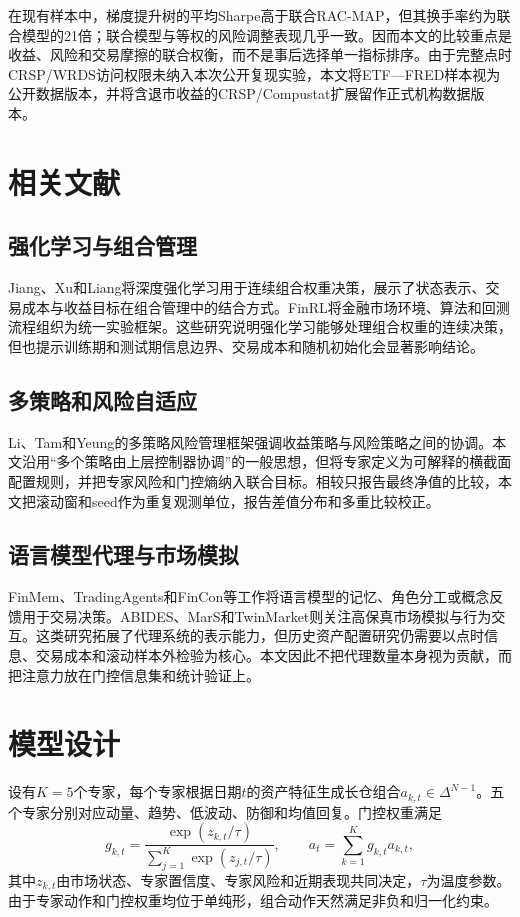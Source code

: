 \documentclass[UTF8,a4paper,zihao=-4]{ctexart}
\begin{document}
在现有样本中，梯度提升树的平均Sharpe高于联合RAC-MAP，但其换手率约为联合模型的21倍；联合模型与等权的风险调整表现几乎一致。因而本文的比较重点是收益、风险和交易摩擦的联合权衡，而不是事后选择单一指标排序。由于完整点时CRSP/WRDS访问权限未纳入本次公开复现实验，本文将ETF—FRED样本视为公开数据版本，并将含退市收益的CRSP/Compustat扩展留作正式机构数据版本。

\section{相关文献}
\subsection{强化学习与组合管理}
Jiang、Xu和Liang\cite{JiangXuLiang2017}将深度强化学习用于连续组合权重决策，展示了状态表示、交易成本与收益目标在组合管理中的结合方式。FinRL将金融市场环境、算法和回测流程组织为统一实验框架\cite{LiuYangChen2020}。这些研究说明强化学习能够处理组合权重的连续决策，但也提示训练期和测试期信息边界、交易成本和随机初始化会显著影响结论。

\subsection{多策略和风险自适应}
Li、Tam和Yeung\cite{LiTamYeung2024}的多策略风险管理框架强调收益策略与风险策略之间的协调。本文沿用“多个策略由上层控制器协调”的一般思想，但将专家定义为可解释的横截面配置规则，并把专家风险和门控熵纳入联合目标。相较只报告最终净值的比较，本文把滚动窗和seed作为重复观测单位，报告差值分布和多重比较校正。

\subsection{语言模型代理与市场模拟}
FinMem、TradingAgents和FinCon等工作将语言模型的记忆、角色分工或概念反馈用于交易决策\cite{YuLiChen2023,XiaoSunLuo2024,YuYaoLi2024}。ABIDES、MarS和TwinMarket则关注高保真市场模拟与行为交互\cite{ByrdHybinetteBalch2019,LiLiuLiu2024,YangZhangWu2025}。这类研究拓展了代理系统的表示能力，但历史资产配置研究仍需要以点时信息、交易成本和滚动样本外检验为核心。本文因此不把代理数量本身视为贡献，而把注意力放在门控信息集和统计验证上。

\section{模型设计}
设有$K=5$个专家，每个专家根据日期$t$的资产特征生成长仓组合$a_{k,t}\in\Delta^{N-1}$。五个专家分别对应动量、趋势、低波动、防御和均值回复。门控权重满足
\begin{equation}
g_{k,t}=\frac{\exp(z_{k,t}/\tau)}{\sum_{j=1}^{K}\exp(z_{j,t}/\tau)},\qquad
 a_t=\sum_{k=1}^{K}g_{k,t}a_{k,t},
\end{equation}
其中$z_{k,t}$由市场状态、专家置信度、专家风险和近期表现共同决定，$\tau$为温度参数。由于专家动作和门控权重均位于单纯形，组合动作天然满足非负和归一化约束。
\end{document}
